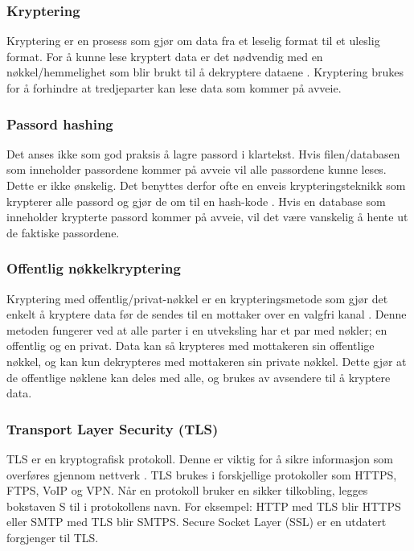 \subsubsection{Kryptering}
\label{sec:analysis-security-encryption}
Kryptering er en prosess som gjør om data fra et leselig format til et uleslig format. For å kunne lese kryptert data er det nødvendig med en nøkkel/hemmelighet som blir brukt til å dekryptere dataene \cite[s.~117-118]{NattTomHeine2015Datasikkerhet}. Kryptering brukes for å forhindre at tredjeparter kan lese data som kommer på avveie.
 
\subsubsection{Passord hashing}
\label{sec:analysis-security-password-hashing}
Det anses ikke som god praksis å lagre passord i klartekst. Hvis filen/databasen som inneholder passordene kommer på avveie vil alle passordene kunne leses. Dette er ikke ønskelig. Det benyttes derfor ofte en enveis krypteringsteknikk som krypterer alle passord og gjør de om til en hash-kode \cite[s.~100-103]{NattTomHeine2015Datasikkerhet}. Hvis en database som inneholder krypterte passord kommer på avveie, vil det være vanskelig å hente ut de faktiske passordene.
 
\subsubsection{Offentlig nøkkelkryptering}
\label{sec:analysis-security-public_key-cryptography}
Kryptering med offentlig/privat-nøkkel er en krypteringsmetode som gjør det enkelt å kryptere data før de sendes til en mottaker over en valgfri kanal \cite[s.~58-60]{NattTomHeine2015Datasikkerhet}. Denne metoden fungerer ved at alle parter i en utveksling har et par med nøkler; en offentlig og en privat. Data kan så krypteres med mottakeren sin offentlige nøkkel, og kan kun dekrypteres med mottakeren sin private nøkkel. Dette gjør at de offentlige nøklene kan deles med alle, og brukes av avsendere til å kryptere data.
 
\subsubsection{Transport Layer Security (TLS)}
\label{sec:analysis-security-tls}
TLS er en kryptografisk protokoll. Denne er viktig for å sikre informasjon som overføres gjennom nettverk \cite{thomas2000ssl}. TLS brukes i forskjellige protokoller som HTTPS, FTPS, VoIP og VPN.
Når en protokoll bruker en sikker tilkobling, legges bokstaven S til i protokollens navn. For eksempel: HTTP med TLS blir HTTPS eller SMTP med TLS blir SMTPS.
Secure Socket Layer (SSL) er en utdatert forgjenger til TLS.
 

